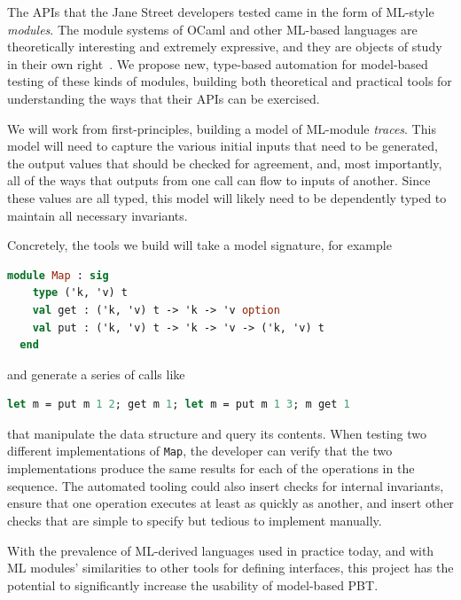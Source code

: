 The APIs that the Jane Street developers tested came in the form of ML-style
{\em modules}. The module systems of OCaml and other
ML-based languages are theoretically interesting and extremely expressive, and
they are objects of study in their own right~\cite{macqueen_modules_1984}. We propose
new, type-based automation for model-based testing of these kinds of modules,
building both theoretical and practical tools for understanding the ways that
their APIs can be exercised.

We will work from first-principles, building a model of ML-module {\em traces}.
This model will need to capture the various initial inputs that need to be
generated, the output values that should be checked for agreement, and, most
importantly, all of the ways that outputs from one call can flow to inputs of
another. Since these values are all typed, this model will likely need to be
dependently typed to maintain all necessary invariants.

Concretely, the tools we build will take a model signature, for example
\begin{lstlisting}[language=Caml]
  module Map : sig
    type ('k, 'v) t
    val get : ('k, 'v) t -> 'k -> 'v option
    val put : ('k, 'v) t -> 'k -> 'v -> ('k, 'v) t
  end
\end{lstlisting}
and generate a series of calls like
\begin{lstlisting}[language=Caml]
  let m = put m 1 2; get m 1; let m = put m 1 3; m get 1
\end{lstlisting}
that manipulate the data structure and query its contents.
When testing two
different implementations of \lstinline{Map}, the developer can verify that the
two implementations produce the same results for each of the operations in the
sequence. The automated tooling could also insert checks for internal
invariants, ensure that one operation executes at least as quickly as another,
and insert other checks that are simple to specify but tedious to implement
manually.

With the prevalence of ML-derived languages used in practice today, and with ML
modules' similarities to other tools for defining interfaces, this project has
the potential to significantly increase the usability of model-based
PBT.


